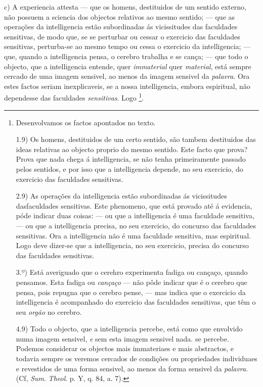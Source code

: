 c) A experiencia attesta --- que os homens, destituidos de um sentido externo, não possuem a sciencia dos objectos relativos ao mesmo sentido; --- que as operações da intelligencia estão subordinadas ás vicissitudes das faculdades sensitivas, de modo que, se se perturbar ou cessar o exercicio das faculdades sensitivas, perturba-se ao mesmo tempo ou cessa o exercicio da intelligencia; --- que, quando a intelligencia pensa, o cerebro trabalha e se cança; --- que todo o objecto, que a intelligencia entende, quer \emph{immaterial} quer \emph{material}, está sempre cercado de uma imagem sensivel, ao menos da imagem sensivel da \emph{palavra}. Ora estes factos seriam inexplicaveis, se a nossa intelligencia, embora espiritual, não dependesse das faculdades \emph{sensitivas}. Logo \footnote{Desenvolvamos os factos apontados no texto.\par 1.9) Os homens, destituidos de um certo sentido, são tambem destituidos das ideas relativas ao objecto proprio do mesmo sentido. Este facto que prova? Prova que nada chega á intelligencia, se não tenha primeiramente passado pelos sentidos, e por isso que a intelligencia depende, no seu exercicio, do exercicio das faculdades sensitivas.\par 2.9) As operações da intelligencia estão subordinadas ás vicissitudes dasfaculdades sensitivas. Este phenomeno, que está provado até á evidencia, póde indicar duas coisas: --- ou que a intelligencia é uma faculdade sensitiva, --- ou que a intelligencia precisa, no seu exercicio, do concurso das faculdades sensitivas. Ora a intelligencia não é uma faculdade sensitiva, mas espiritual. Logo deve dizer-se que a intelligencia, no seu exercicio, precisa do concurso das faculdades sensitivas.\par 3.º) Está averiguado que o cerehro experimenta fadiga ou cançaço, quando pensamos. Esta fadiga ou \emph{cançaço} --- não pôde indicar que é o cerebro que pensa, pois repugna que o cerebro pense, --- mas indica que o exercicio da intelligencia é acompanhado do exercicio das faculdades sensitivas, que têm o seu \emph{orgão} no cerebro.\par 4.9) Todo o objecto, que a intelligencia percebe, está como que envolvido numa imagem sensivel, \emph{e} sem esta imagem sensivel nada. se percebe. Podemos considerar os objectos mais immateriaes e mais abstractos, e todavia sempre os veremos cercados de condições ou propriedades individuaes e revestidos de uma forma sensivel, ao menos da forma sensivel da \emph{palavra}. (Cf, \emph{Sum}. \emph{Theol}. p. Y, q. 84, a. 7).}.

